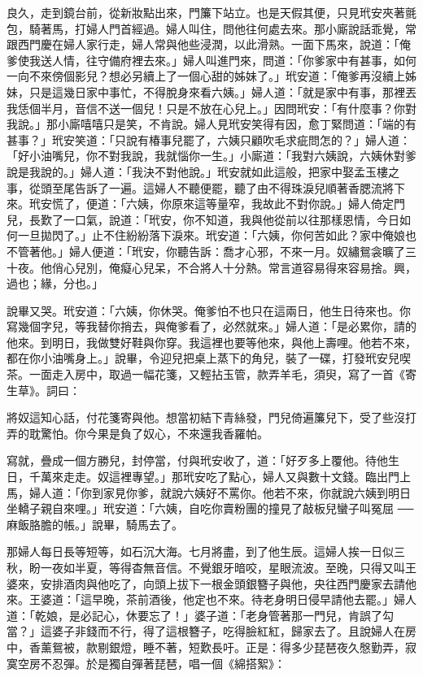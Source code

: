 良久，走到鏡台前，從新妝點出來，門簾下站立。也是天假其便，只見玳安夾著氈包，騎著馬，打婦人門首經過。婦人叫住，問他往何處去來。那小廝說話乖覺，常跟西門慶在婦人家行走，婦人常與他些浸潤，以此滑熟。一面下馬來，說道：「俺爹使我送人情，往守備府裡去來。」婦人叫進門來，問道：「你爹家中有甚事，如何一向不來傍個影兒？想必另續上了一個心甜的姊妹了。」玳安道：「俺爹再沒續上姊妹，只是這幾日家中事忙，不得脫身來看六姨。」婦人道：「就是家中有事，那裡丟我恁個半月，音信不送一個兒！只是不放在心兒上。」因問玳安：「有什麼事？你對我說。」那小廝嘻嘻只是笑，不肯說。婦人見玳安笑得有因，愈丁緊問道：「端的有甚事？」玳安笑道：「只說有椿事兒罷了，六姨只顧吹毛求疵問怎的？」婦人道：「好小油嘴兒，你不對我說，我就惱你一生。」小廝道：「我對六姨說，六姨休對爹說是我說的。」婦人道：「我決不對他說。」玳安就如此這般，把家中娶孟玉樓之事，從頭至尾告訴了一遍。這婦人不聽便罷，聽了由不得珠淚兒順著香腮流將下來。玳安慌了，便道：「六姨，你原來這等量窄，我故此不對你說。」婦人倚定門兒，長歎了一口氣，說道：「玳安，你不知道，我與他從前以往那樣恩情，今日如何一旦拋閃了。」止不住紛紛落下淚來。玳安道：「六姨，你何苦如此？家中俺娘也不管著他。」婦人便道：「玳安，你聽告訴：喬才心邪，不來一月。奴繡鴛衾曠了三十夜。他俏心兒別，俺癡心兒呆，不合將人十分熱。常言道容易得來容易捨。興，過也；緣，分也。」

說畢又哭。玳安道：「六姨，你休哭。俺爹怕不也只在這兩日，他生日待來也。你寫幾個字兒，等我替你捎去，與俺爹看了，必然就來。」婦人道：「是必累你，請的他來。到明日，我做雙好鞋與你穿。我這裡也要等他來，與他上壽哩。他若不來，都在你小油嘴身上。」說畢，令迎兒把桌上蒸下的角兒，裝了一碟，打發玳安兒喫茶。一面走入房中，取過一幅花箋，又輕拈玉管，款弄羊毛，須臾，寫了一首《寄生草》。詞曰：

將奴這知心話，付花箋寄與他。想當初結下青絲發，門兒倚遍簾兒下，受了些沒打弄的耽驚怕。你今果是負了奴心，不來還我香羅帕。

寫就，疊成一個方勝兒，封停當，付與玳安收了，道：「好歹多上覆他。待他生日，千萬來走走。奴這裡專望。」那玳安吃了點心，婦人又與數十文錢。臨出門上馬，婦人道：「你到家見你爹，就說六姨好不罵你。他若不來，你就說六姨到明日坐轎子親自來哩。」玳安道：「六姨，自吃你賣粉團的撞見了敲板兒蠻子叫冤屈 ──麻飯胳膽的帳。」說畢，騎馬去了。

那婦人每日長等短等，如石沉大海。七月將盡，到了他生辰。這婦人挨一日似三秋，盼一夜如半夏，等得杳無音信。不覺銀牙暗咬，星眼流波。至晚，只得又叫王婆來，安排酒肉與他吃了，向頭上拔下一根金頭銀簪子與他，央往西門慶家去請他來。王婆道：「這早晚，茶前酒後，他定也不來。待老身明日侵早請他去罷。」婦人道：「乾娘，是必記心，休要忘了！」婆子道：「老身管著那一門兒，肯誤了勾當？」這婆子非錢而不行，得了這根簪子，吃得臉紅紅，歸家去了。且說婦人在房中，香薰鴛被，款剔銀燈，睡不著，短歎長吁。正是：得多少琵琶夜久慇勤弄，寂寞空房不忍彈。於是獨自彈著琵琶，唱一個《綿搭絮》：

